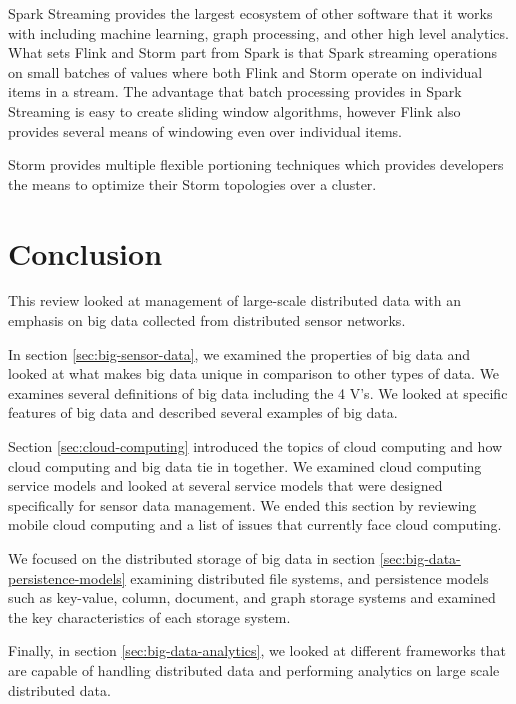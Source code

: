 \documentclass[]{article}
\begin{document}
Spark Streaming provides the largest ecosystem of other software that it works with including machine learning, graph processing, and other high level analytics. What sets Flink and Storm part from Spark is that Spark streaming operations on small batches of values where both Flink and Storm operate on individual items in a stream. The advantage that batch processing provides in Spark Streaming is easy to create sliding window algorithms, however Flink also provides several means of windowing even over individual items.

Storm provides multiple flexible portioning techniques which provides developers the means to optimize their Storm topologies over a cluster.

\section{Conclusion}\label{sec:conclusion}
This review looked at management of large-scale distributed data with an emphasis on big data collected from distributed sensor networks. 

In section \ref{sec:big-sensor-data}, we examined the properties of big data and looked at what makes big data unique in comparison to other types of data. We examines several definitions of big data including the 4 V's. We looked at specific features of big data and described several examples of big data.

Section \ref{sec:cloud-computing} introduced the topics of cloud computing and how cloud computing and big data tie in together. We examined cloud computing service models and looked at several service models that were designed specifically for sensor data management. We ended this section by reviewing mobile cloud computing and a list of issues that currently face cloud computing.

We focused on the distributed storage of big data in section \ref{sec:big-data-persistence-models} examining distributed file systems, and persistence models such as key-value, column, document, and graph storage systems and examined the key characteristics of each storage system.

Finally, in section \ref{sec:big-data-analytics}, we looked at different frameworks that are capable of handling distributed data and performing analytics on large scale distributed data.



\end{document}
